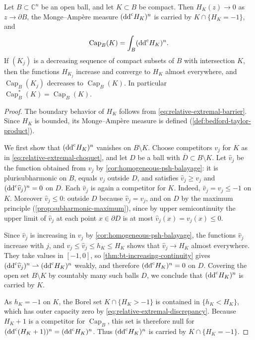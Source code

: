 \begin{proposition}\label{prop:relative-extremal-compact}
Let $B\subset\mathbb C^n$ be an open ball, and let $K\subset B$ be compact. Then $H_K(z)\to0$ as $z\to\partial B$, the Monge--Amp\`ere measure $(\mathrm{dd}^{\mathrm{c}} H_K)^n$ is carried by $K\cap\{H_K=-1\}$, and
\[
 \operatorname{Cap}_B(K)=\int_B(\mathrm{dd}^{\mathrm{c}} H_K)^n.
\]
If $(K_j)$ is a decreasing sequence of compact subsets of $B$ with intersection $K$, then the functions $H_{K_j}$ increase and converge to $H_K$ almost everywhere, and $\operatorname{Cap}_B(K_j)$ decreases to $\operatorname{Cap}_B(K)$. In particular $\operatorname{Cap}_B^*(K)=\operatorname{Cap}_B(K)$.
\end{proposition}
\begin{proof}
The boundary behavior of $H_K$ follows from \eqref{eq:relative-extremal-barrier}. Since $H_K$ is bounded, its Monge--Amp\`ere measure is defined (\cref{def:bedford-taylor-product}).

We first show that $(\mathrm{dd}^{\mathrm{c}} H_K)^n$ vanishes on $B\setminus K$. Choose competitors $v_j$ for $K$ as in \eqref{eq:relative-extremal-choquet}, and let $D$ be a ball with $\overline D\subset B\setminus K$. Let $\widehat v_j$ be the function obtained from $v_j$ by \cref{cor:homogeneous-psh-balayage}: it is plurisubharmonic on $B$, equals $v_j$ outside $D$, and satisfies $\widehat v_j\ge v_j$ and $(\mathrm{dd}^{\mathrm{c}}\widehat v_j)^n=0$ on $D$. Each $\widehat v_j$ is again a competitor for $K$. Indeed, $\widehat v_j=v_j\le-1$ on $K$. Moreover $\widehat v_j\le0$: outside $D$ because $\widehat v_j=v_j$, and on $D$ by the maximum principle (\cref{prop:subharmonic-maximum}), since by upper semicontinuity the upper limit of $\widehat v_j$ at each point $x\in\partial D$ is at most $\widehat v_j(x)=v_j(x)\le0$.

Since $\widehat v_j$ is increasing in $v_j$ by \cref{cor:homogeneous-psh-balayage}, the functions $\widehat v_j$ increase with $j$, and $v_j\le\widehat v_j\le h_K\le H_K$ shows that $\widehat v_j\to H_K$ almost everywhere. They take values in $[-1,0]$, so \cref{thm:bt-increasing-continuity} gives $(\mathrm{dd}^{\mathrm{c}}\widehat v_j)^n\rightharpoonup(\mathrm{dd}^{\mathrm{c}} H_K)^n$ weakly, and therefore $(\mathrm{dd}^{\mathrm{c}} H_K)^n=0$ on $D$. Covering the open set $B\setminus K$ by countably many such balls $D$, we conclude that $(\mathrm{dd}^{\mathrm{c}} H_K)^n$ is carried by $K$.

As $h_K=-1$ on $K$, the Borel set $K\cap\{H_K>-1\}$ is contained in $\{h_K<H_K\}$, which has outer capacity zero by \eqref{eq:relative-extremal-discrepancy}. Because $H_K+1$ is a competitor for $\operatorname{Cap}_B$, this set is therefore null for $(\mathrm{dd}^{\mathrm{c}}(H_K+1))^n=(\mathrm{dd}^{\mathrm{c}} H_K)^n$. Thus $(\mathrm{dd}^{\mathrm{c}} H_K)^n$ is carried by $K\cap\{H_K=-1\}$.


\end{proof}
